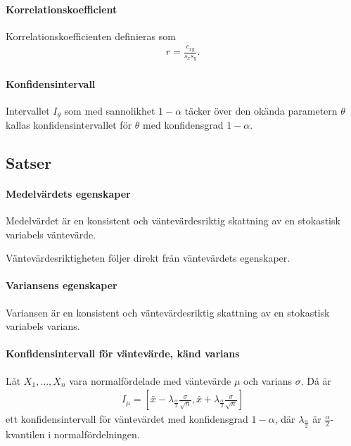 \paragraph{Korrelationskoefficient}
Korrelationskoefficienten definieras som
\begin{align*}
	r = \frac{c_{xy}}{s_{x}s_{y}}.
\end{align*}

\paragraph{Konfidensintervall}
Intervallet $I_{\theta}$ som med sannolikhet $1 - \alpha$ täcker över den okända parametern $\theta$ kallas konfidensintervallet för $\theta$ med konfidensgrad $1 - \alpha$.

\subsection{Satser}

\paragraph{Medelvärdets egenskaper}
Medelvärdet är en konsistent och väntevärdesriktig skattning av en stokastisk variabels väntevärde.

\proof
Väntevärdesriktigheten följer direkt från väntevärdets egenskaper.

\paragraph{Variansens egenskaper}
Variansen är en konsistent och väntevärdesriktig skattning av en stokastisk variabels varians.

\proof

\paragraph{Konfidensintervall för väntevärde, känd varians}
Låt $X_1, \dots, X_{n}$ vara normalfördelade med väntevärde $\mu$ och varians $\sigma$. Då är
\begin{align*}
	I_{\mu} = \left[\bar{x} - \lambda_{\frac{\alpha}{2}}\frac{\sigma}{\sqrt{n}}, \bar{x} + \lambda_{\frac{\alpha}{2}}\frac{\sigma}{\sqrt{n}}\right]
\end{align*}
ett konfidensintervall för väntevärdet med konfidensgrad $1 - \alpha$, där $\lambda_{\frac{\alpha}{2}}$ är $\frac{\alpha}{2}$-kvantilen i normalfördelningen.

